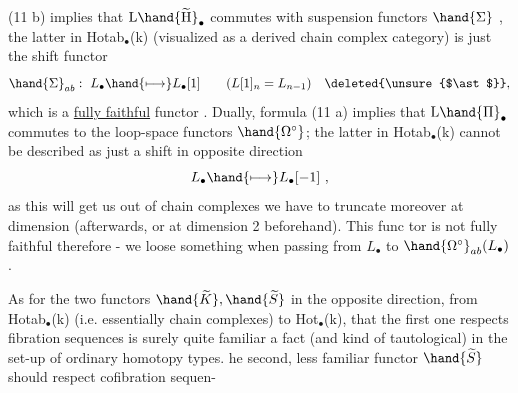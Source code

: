  (11 b) implies that $\mathrm{L}\hand{\widetilde{\mathrm{H}}}_{\bullet}$ commutes with suspension functors $\hand{\Sigma}$ ,
the latter in Hotab$_{\bullet}$(k) (visualized as a derived chain complex category)
is just the shift functor
\[ \hand{\Sigma}_{ab} : \ L_{\bullet} \hand{\longmapsto} L_{\bullet}[1] \qquad ( L[1]_{n} = L_{n-1}) \quad \deleted{\unsure{$\ast$}} , \]
which is a \uline{fully faithful} functor . Dually, formula (11 a) implies
that $\mathrm{L}\hand{\Pi}_{\bullet}$ commutes to the loop-space functors $\hand{\Omega^{\circ}}$; the latter in
Hotab$_{\bullet}$(k) cannot be described as just a shift in opposite direction
\[ L_{\bullet} \hand{\longmapsto} L_{\bullet}[-1] \ , \]
as this will get us out of  chain complexes we have to truncate moreover
at dimension  (afterwards, or at dimension  2 beforehand). This func%
tor is not fully faithful therefore - we loose something when passing
from $L_{\bullet}$ to $\hand{\Omega^{\circ}}_{ab}(L_{\bullet})$.

As for the two functors $\hand{\widetilde{K}},\hand{\widetilde{S}}$  in the opposite direction, from
Hotab$_{\bullet}$(k) (i.e. essentially chain complexes) to Hot$_{\bullet}$(k), that the
first one respects fibration sequences is surely quite familiar a fact
(and kind of tautological) in the set-up of ordinary homotopy types. 
he second, less familiar functor $\hand{\widetilde{S}}$ should respect cofibration sequen-%

